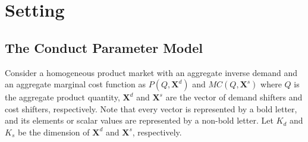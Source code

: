 \documentclass[11pt, a4paper]{article}
\begin{document}















\section{Setting}\label{sec:setting}

\subsection{The Conduct Parameter Model}\label{subsec:model_and_assumptions}

Consider a homogeneous product market with an aggregate inverse demand and an aggregate marginal cost function as $P(Q, \bm{X}^{d})$ and $MC(Q, \bm{X}^{s})$ where $Q$ is the aggregate product quantity, $\bm{X}^{d}$ and $\bm{X}^{s}$ are the vector of demand shifters and cost shifters, respectively.
Note that every vector is represented by a bold letter, and its elements or scalar values are represented by a non-bold letter.
Let $K_d$ and $K_s$ be the dimension of $\bm{X}^{d}$ and $\bm{X}^{s}$, respectively.
\end{document}
